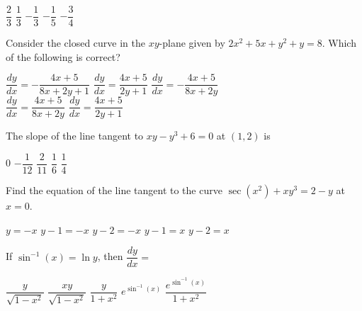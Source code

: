 \begin{questions}
    \begin{oneparchoices}
        \choice $\dfrac{2}{3}$
        \choice $\dfrac{1}{3}$
        \choice $-\dfrac{1}{3}$
        \choice $-\dfrac{1}{5}$
        \choice $-\dfrac{3}{4}$
    \end{oneparchoices} \par \horizontalline   

    \question Consider the closed curve in the $xy$-plane given by $2x^2 + 5x + y^2 + y = 8$. Which of the following is correct? \\

    \begin{oneparchoices}
        \choice $\dfrac{dy}{dx} = -\dfrac{4x + 5}{8x + 2y + 1}$
        \choice $\dfrac{dy}{dx} = \dfrac{4x + 5}{2y + 1}$
        \choice $\dfrac{dy}{dx} = -\dfrac{4x + 5}{8x + 2y}$ \\[11pt]
        \makebox[0.21\textwidth] \choice $\dfrac{dy}{dx} = \dfrac{4x + 5}{8x + 2y}$
        \makebox[0.25\textwidth] \choice $\dfrac{dy}{dx} = \dfrac{4x + 5}{2y + 1}$
    \end{oneparchoices} \par \horizontalline

    \question The slope of the line tangent to $xy - y^3 + 6 = 0$ at $(1, 2)$ is \\

    \begin{oneparchoices}
        \choice $0$
        \choice $-\dfrac{1}{12}$
        \choice $\dfrac{2}{11}$
        \choice $\dfrac{1}{6}$
        \choice $\dfrac{1}{4}$
    \end{oneparchoices} \par \horizontalline

    \question Find the equation of the line tangent to the curve $\sec \left(x^2\right)+ xy^3 = 2 - y$ at $x = 0$. \\

    \begin{oneparchoices}
        \choice $y = -x$
        \choice $y - 1 = -x$
        \choice $y - 2 = -x$
        \choice $y - 1 = x$
        \choice $y - 2 = x$
    \end{oneparchoices} \par \horizontalline

    \question If $\sin^{-1} (x) = \ln y$, then $\dfrac{dy}{dx} = $ \\

    \begin{oneparchoices}
        \choice $\dfrac{y}{\sqrt{1 - x^2}}$
        \choice $\dfrac{xy}{\sqrt{1 - x^2}}$
        \choice $\dfrac{y}{1 + x^2}$
        \choice $e^{\sin^{-1} (x)}$
        \choice $\dfrac{e^{\sin^{-1} (x)}}{1 + x^2}$
    \end{oneparchoices} \par \horizontalline


\end{questions}
